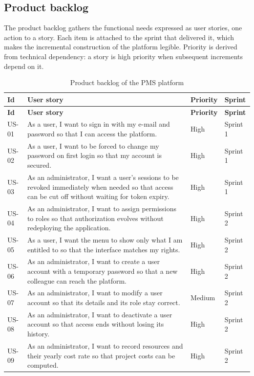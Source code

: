 \subsection{Product backlog}
The product backlog gathers the functional needs expressed as user stories, one
action to a story. Each item is attached
to the sprint that delivered it, which makes the incremental construction of the platform legible.
Priority is derived from technical dependency: a story is high priority when subsequent increments
depend on it.

\begin{longtable}{|m{1.1cm}|m{9.2cm}|m{1.9cm}|m{1.6cm}|}
\caption{Product backlog of the PMS platform}\label{tab:backlog}\\
\hline
\textbf{Id} & \textbf{User story} & \textbf{Priority} & \textbf{Sprint} \\
\hline
\endfirsthead
\hline
\textbf{Id} & \textbf{User story} & \textbf{Priority} & \textbf{Sprint} \\
\hline
\endhead
\endfoot
\endlastfoot
\hline
US-01 & As a user, I want to sign in with my e-mail and password so that I can access the platform. & High & Sprint 1 \\
\hline
US-02 & As a user, I want to be forced to change my password on first login so that my account is secured. & High & Sprint 1 \\
\hline
US-03 & As an administrator, I want a user's sessions to be revoked immediately when needed so that access can be cut off without waiting for token expiry. & High & Sprint 1 \\
\hline
US-04 & As an administrator, I want to assign permissions to roles so that authorization evolves without redeploying the application. & High & Sprint 2 \\
\hline
US-05 & As a user, I want the menu to show only what I am entitled to so that the interface matches my rights. & High & Sprint 2 \\
\hline
US-06 & As an administrator, I want to create a user account with a temporary password so that a new colleague can reach the platform. & High & Sprint 2 \\
\hline
US-07 & As an administrator, I want to modify a user account so that its details and its role stay correct. & Medium & Sprint 2 \\
\hline
US-08 & As an administrator, I want to deactivate a user account so that access ends without losing its history. & High & Sprint 2 \\
\hline
US-09 & As an administrator, I want to record resources and their yearly cost rate so that project costs can be computed. & High & Sprint 2 \\

\end{longtable}
